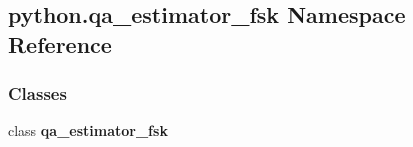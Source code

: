 \subsection{python.\+qa\+\_\+estimator\+\_\+fsk Namespace Reference}
\label{namespacepython_1_1qa__estimator__fsk}
\subsubsection*{Classes}
\begin{DoxyCompactItemize}
\item 
class {\bf qa\+\_\+estimator\+\_\+fsk}
\end{DoxyCompactItemize}
